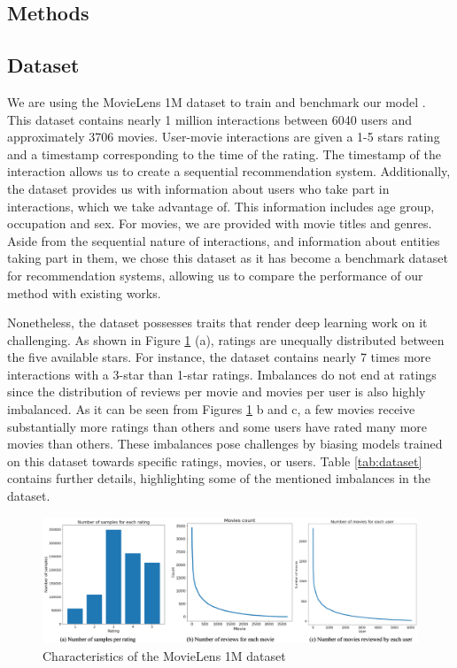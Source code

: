 \documentclass{bioinfo}
\begin{document}
\begin{methods}

\section{Methods}

\subsection{Dataset}

We are using the MovieLens 1M dataset to train and benchmark our model \citep{harper2015movielens}. This dataset contains nearly 1 million interactions between 6040 users and approximately 3706 movies. User-movie interactions are given a 1-5 stars rating and a timestamp corresponding to the time of the rating. The timestamp of the interaction allows us to create a sequential recommendation system. Additionally, the dataset provides us with information about users who take part in interactions, which we take advantage of. This information includes age group, occupation and sex. For movies, we are provided with movie titles and genres. Aside from the sequential nature of interactions, and information about entities taking part in them, we chose this dataset as it has become a benchmark dataset for recommendation systems, allowing us to compare the performance of our method with existing works.

Nonetheless, the dataset possesses traits that render deep learning work on it challenging. As shown in Figure \ref{fig:dataset} (a), ratings are unequally distributed between the five available stars. For instance, the dataset contains nearly 7 times more interactions with a 3-star than 1-star ratings. Imbalances do not end at ratings since the distribution of reviews per movie and movies per user is also highly imbalanced. As it can be seen from Figures \ref{fig:dataset} b and c, a few movies receive substantially more ratings than others and some users have rated many more movies than others. These imbalances pose challenges by biasing models trained on this dataset towards specific ratings, movies, or users. Table \ref{tab:dataset} contains further details, highlighting some of the mentioned imbalances in the dataset. 

\begin{figure}[h]
    \centering
    \includegraphics[width=\textwidth,height=0.33\textwidth]{figures/dataset.png}
    \caption{Characteristics of the MovieLens 1M dataset}
    \label{fig:dataset}
\end{figure}


\end{methods}
\end{document}
